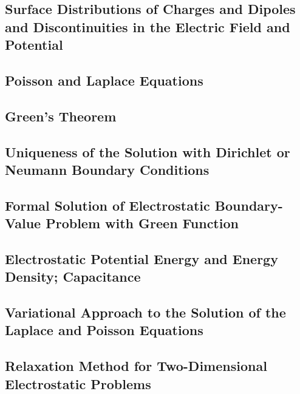\subsection{Surface Distributions of Charges and Dipoles and Discontinuities in the Electric Field and Potential}
\subsection{Poisson and Laplace Equations}
\subsection{Green's Theorem}
\subsection{Uniqueness of the Solution with Dirichlet or Neumann Boundary Conditions}
\subsection{Formal Solution of Electrostatic Boundary-Value Problem with Green Function}
\subsection{Electrostatic Potential Energy and Energy Density; Capacitance}
\subsection{Variational Approach to the Solution of the Laplace and Poisson Equations}
\subsection{Relaxation Method for Two-Dimensional Electrostatic Problems}






